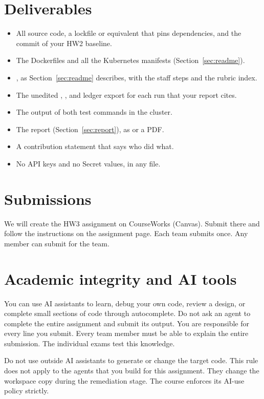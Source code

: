 \documentclass[9pt,letterpaper]{article}
\begin{document}
\section{Deliverables}\label{sec:deliverables}
\begin{itemize}
\item All source code, a lockfile or equivalent that pins dependencies, and the
  commit of your HW2 baseline.
\item The Dockerfiles and all the Kubernetes manifests (Section~\ref{sec:readme}).
\item {}, as Section~\ref{sec:readme} describes, with the staff
  steps and the rubric index.
\item The unedited , , and ledger export for
  each run that your report cites.
\item The output of both test commands in the cluster.
\item The report (Section~\ref{sec:report}), as  or a PDF.
\item A contribution statement that says who did what.
\item No API keys and no Secret values, in any file.
\end{itemize}

\section{Submissions}

We will create the HW3 assignment on CourseWorks (Canvas). Submit there and follow
the instructions on the assignment page. Each team submits once. Any member can
submit for the team.

\section{Academic integrity and AI tools}

You can use AI assistants to learn, debug your own code, review a design, or
complete small sections of code through autocomplete. Do not ask an agent to
complete the entire assignment and submit its output. You are responsible for
every line you submit. Every team member must be able to explain the entire
submission. The individual exams test this knowledge.

Do not use outside AI assistants to generate or change the target code. This
rule does not apply to the agents that you build for this assignment. They
change the workspace copy during the remediation stage. The course enforces its
AI-use policy strictly.
\end{document}

